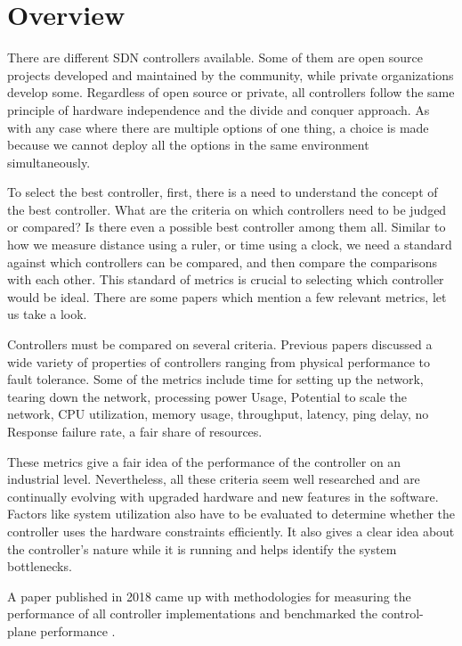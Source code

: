 \chapter{Overview}

    There are different SDN controllers available. Some of them are open source projects developed and maintained by the community, while private organizations develop some. Regardless of open source or private, all controllers follow the same principle of hardware independence and the divide and conquer approach. As with any case where there are multiple options of one thing, a choice is made because we cannot deploy all the options in the same environment simultaneously.
 
    To select the best controller, first, there is a need to understand the concept of the best controller. What are the criteria on which controllers need to be judged or compared? Is there even a possible best controller among them all. Similar to how we measure distance using a ruler, or time using a clock, we need a standard against which controllers can be compared, and then compare the comparisons with each other. This standard of metrics is crucial to selecting which controller would be ideal. There are some papers which mention a few relevant metrics, let us take a look.
    
    Controllers must be compared on several criteria. Previous papers discussed a wide variety of properties of controllers ranging from physical performance to fault tolerance. Some of the metrics include time for setting up the network, tearing down the network, processing power Usage, Potential to scale the network, CPU utilization, memory usage, throughput, latency, ping delay, no Response failure rate, a fair share of resources.
    
    These metrics give a fair idea of the performance of the controller on an industrial level. Nevertheless, all these criteria seem well researched and are continually evolving with upgraded hardware and new features in the software. Factors like system utilization also have to be evaluated to determine whether the controller uses the hardware constraints efficiently. It also gives a clear idea about the controller's nature while it is running and helps identify the system bottlenecks.
    
    A paper published in 2018 came up with methodologies for measuring the performance of all controller implementations and benchmarked the control- plane performance \cite{rfc8456}.
    
